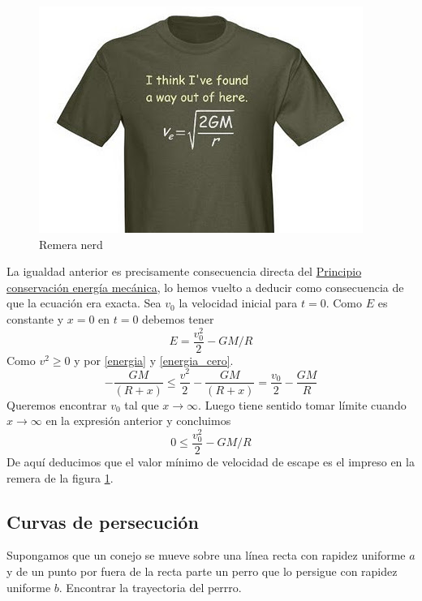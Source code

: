 \documentclass{article}
\begin{document}
\begin{figure}
\begin{center}
 \includegraphics[scale=.3]{imagenes/velocidad_escape.jpg}
\end{center}
\caption{Remera nerd}\label{fig:vel_escape}
\end{figure}
La igualdad anterior es precisamente  consecuencia directa del \href{https://docs.google.com/file/d/0B80iJ0HgObRRWll6MlJFSjFNMGc/edit}{Principio conservación energía mecánica}, lo hemos vuelto a deducir como consecuencia de que la ecuación era exacta.  Sea $v_0$ la velocidad inicial para $t=0$. Como $E$ es constante y $x=0$ en $t=0$ debemos tener
\begin{equation}\label{energia_cero}
 E=\frac{v_0^2}{2}-GM/R
\end{equation}
Como $v^2\geq 0$ y por \eqref{energia} y \eqref{energia_cero}.
\[-\frac{GM}{(R+x)}\leq\frac{v^2}{2}-\frac{GM}{(R+x)}=\frac{v_0}{2}-\frac{GM}{R}\]
Queremos encontrar $v_0$ tal que $x\to\infty$. Luego tiene sentido tomar límite cuando $x\to\infty$ en la expresión anterior y concluimos
\[0\leq \frac{v_0^2}{2}-GM/R\]
De aquí deducimos que el valor mínimo de velocidad de escape es el impreso en la remera de la figura \ref{fig:vel_escape}.

\subsection{Curvas de persecución}
 
\begin{problema} Supongamos que un conejo se mueve sobre una
línea recta con rapidez uniforme $a$ y de un punto por fuera de la recta parte un perro que lo 
persigue con rapidez uniforme $b$. Encontrar la trayectoria del perrro.
\end{problema}
\end{document}
